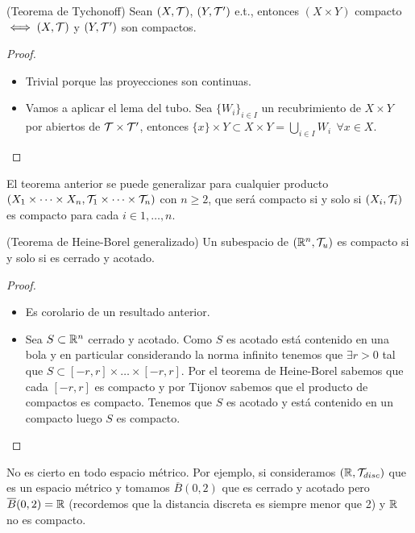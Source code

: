 \begin{teo}
    (Teorema de Tychonoff) Sean $(X, \mathcal{T})$, $(Y, \mathcal{T}')$ e.t., entonces $(X\times Y)$ compacto $\iff (X, \mathcal{T})$ y $(Y, \mathcal{T}')$ son compactos.
    \begin{proof}\
        \begin{itemize}
            \item[$\Rightarrow$)] Trivial porque las proyecciones son continuas.
            \item[$\Leftarrow$)] Vamos a aplicar el lema del tubo. Sea $\{W_i\}_{i\in I}$ un recubrimiento de $X\times Y$ por abiertos de $\mathcal{T}\times \mathcal{T}'$, entonces $\{x\}\times Y \subset X\times Y = \bigcup\limits_{i\in I}W_i\ \ \forall x \in X$. 
        \end{itemize}
    \end{proof}
\end{teo}

\begin{coro}
    El teorema anterior se puede generalizar para cualquier producto $(X_1\times \dots\times X_n, \mathcal{T}_1\times \dots\times \mathcal{T}_n)$ con $n\geq 2$, que será compacto si y solo si $(X_i, \mathcal{T}_i)$ es compacto para cada $i\in 1,\dots,n$.
    \endsquare
\end{coro}

\begin{teo}
    (Teorema de Heine-Borel generalizado) Un subespacio de $(\mathbb{R}^n, \mathcal{T}_u)$ es compacto si y solo si es cerrado y acotado.
    \begin{proof}\
        \begin{itemize}
            \item[$\Rightarrow$ )] Es corolario de un resultado anterior.
            \item[$\Leftarrow$ )] Sea $S\subset \mathbb{R}^n$ cerrado y acotado. Como $S$ es acotado está contenido en una bola y en particular considerando la norma infinito tenemos que $\exists r>0$ tal que $S\subset [-r,r]\times \dots\times [-r,r]$. Por el teorema de Heine-Borel sabemos que cada $[-r,r]$ es compacto y por Tijonov sabemos que el producto de compactos es compacto. Tenemos que $S$ es acotado y está contenido en un compacto luego $S$ es compacto.  %
        \end{itemize}
    \end{proof}
\end{teo}

\begin{observacion}
    No es cierto en todo espacio métrico. Por ejemplo, si consideramos $(\mathbb{R}, \mathcal{T}_{disc})$ que es un espacio métrico y tomamos $\overline{B}(0,2)$ que es cerrado y acotado pero $\overline{B}(0,2)=\mathbb{R}$ (recordemos que la distancia discreta es siempre menor que 2) y $\mathbb{R}$ no es compacto.
    \endsquare
\end{observacion}

